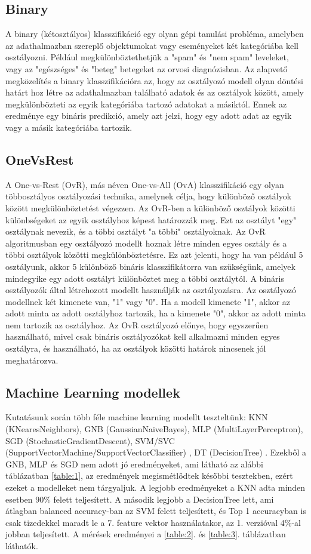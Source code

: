 \documentclass[acmtog, authorversion]{acmart}
\begin{document}
\subsection{Binary}
A binary (kétosztályos) klasszifikáció egy olyan gépi tanulási probléma, amelyben az adathalmazban szereplő objektumokat vagy eseményeket két kategóriába kell osztályozni. Például megkülönböztethetjük a "spam" és "nem spam" leveleket, vagy az "egészséges" és "beteg" betegeket az orvosi diagnózisban.
Az alapvető megközelítés a binary klasszifikációra az, hogy az osztályozó modell olyan döntési határt hoz létre az adathalmazban található adatok és az osztályok között, amely megkülönbözteti az egyik kategóriába tartozó adatokat a másiktól. Ennek az eredménye egy bináris predikció, amely azt jelzi, hogy egy adott adat az egyik vagy a másik kategóriába tartozik.
\subsection{OneVsRest}
A One-vs-Rest (OvR), más néven One-vs-All (OvA) klasszifikáció egy olyan többosztályos osztályozási technika, amelynek célja, hogy különböző osztályok között megkülönböztetést végezzen. Az OvR-ben a különböző osztályok közötti különbségeket az egyik osztályhoz képest határozzák meg. Ezt az osztályt "egy" osztálynak nevezik, és a többi osztályt "a többi" osztályoknak.
Az OvR algoritmusban egy osztályozó modellt hoznak létre minden egyes osztály és a többi osztályok közötti megkülönböztetésre. Ez azt jelenti, hogy ha van például 5 osztályunk, akkor 5 különböző bináris klasszifikátorra van szükségünk, amelyek mindegyike egy adott osztályt különböztet meg a többi osztálytól.
A bináris osztályozók által létrehozott modellt használják az osztályozásra. Az osztályozó modellnek két kimenete van, "1" vagy "0". Ha a modell kimenete "1", akkor az adott minta az adott osztályhoz tartozik, ha a kimenete "0", akkor az adott minta nem tartozik az osztályhoz.
Az OvR osztályozó előnye, hogy egyszerűen használható, mivel csak bináris osztályozókat kell alkalmazni minden egyes osztályra, és használható, ha az osztályok közötti határok nincsenek jól meghatározva.
\subsection{Machine Learning modellek}
Kutatásunk során több féle machine learning modellt teszteltünk: KNN (KNearesNeighbors), GNB (GaussianNaiveBayes), MLP (MultiLayerPerceptron), 
SGD (StochasticGradientDescent), SVM/SVC (SupportVectorMachine/SupportVectorClassifier) \cite{CC01a}, DT (DecisionTree) \cite{Breiman1984ClassificationAR}.
Ezekből a GNB, MLP és SGD nem adott jó eredményeket, ami látható az alábbi táblázatban \ref{table:1}, az eredmények megismétlődtek későbbi tesztekben, ezért
ezeket a modelleket nem tárgyaljuk. A legjobb eredményeket a KNN adta minden esetben 90\% felett teljesített. A második legjobb a DecisionTree lett, ami átlagban
balanced accuracy-ban az SVM felett teljesített, és Top 1 accuracyban is csak tizedekkel maradt le a 7. feature vektor használatakor, az 1. verzióval 4\%-al
jobban teljesített. A mérések eredményei a \ref{table:2}. és \ref{table:3}. táblázatban láthatók. 
\end{document}
